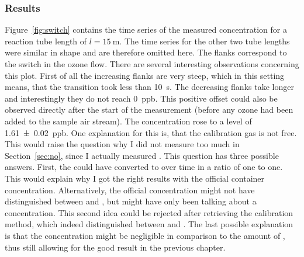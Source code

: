\subsubsection{Results}
\label{sec:switch-results}

Figure~\ref{fig:switch} contains the time series of the measured
 concentration for a reaction tube length of $l =
\SI{15}{\meter}$. The time series for the other two tube lengths were
similar in shape and are therefore omitted here. The flanks correspond
to the switch in the ozone flow. There are several interesting
observations concerning this plot. First of all the increasing flanks
are very steep, which in this setting means, that the transition took
less than \SI{10}{\second}. The decreasing flanks take longer and
interestingly they do not reach \SI{0}{ppb}. This positive offset
could also be observed directly after the start of the measurement
(before any ozone had been added to the 
sample air stream). The concentration rose to a level of
\SI{1.61(2)}{ppb}. One explanation for this is, that the calibration gas is
not  free. This would raise the question why I did not
measure too much  in Section~\ref{sec:no}, since I actually
measured . This question has three possible answers. First, the
 could have converted to  over time in a ratio of
one to one. This would explain why I got the right results with the official
container concentration. Alternatively, the official concentration
might not have distinguished between  and , but might
have only been talking about a  concentration. This second
idea could be rejected after retrieving the calibration method, which
indeed distinguished between  and . The last possible
explanation is that the  concentration might be negligible in
comparison to the amount of , thus still allowing for the good
result in the previous chapter.

